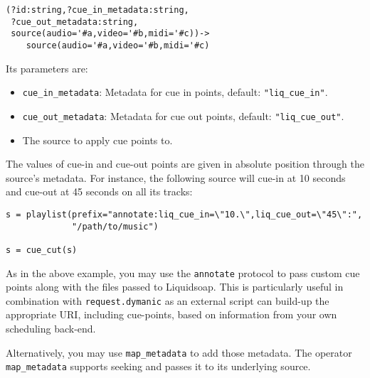\begin{verbatim}
(?id:string,?cue_in_metadata:string,
 ?cue_out_metadata:string,
 source(audio='#a,video='#b,midi='#c))->
    source(audio='#a,video='#b,midi='#c)
\end{verbatim}
Its parameters are:

\begin{itemize}
\item \verb+cue_in_metadata+: Metadata for cue in points, default: \verb+"liq_cue_in"+.
\item \verb+cue_out_metadata+: Metadata for cue out points, default: \verb+"liq_cue_out"+.
\item The source to apply cue points to.

\end{itemize}
The values of cue-in and cue-out points are given in absolute
position through the source's metadata. For instance, the following
source will cue-in at 10 seconds and cue-out at 45 seconds on all its tracks:

\begin{verbatim}
s = playlist(prefix="annotate:liq_cue_in=\"10.\",liq_cue_out=\"45\":",
             "/path/to/music")

s = cue_cut(s)
\end{verbatim}
As in the above example, you may use the \verb+annotate+ protocol to pass custom cue
points along with the files passed to Liquidsoap. This is particularly useful 
in combination with \verb+request.dymanic+ as an external script can build-up
the appropriate URI, including cue-points, based on information from your
own scheduling back-end.

Alternatively, you may use \verb+map_metadata+ to add those metadata. The operator
\verb+map_metadata+ supports seeking and passes it to its underlying source.

